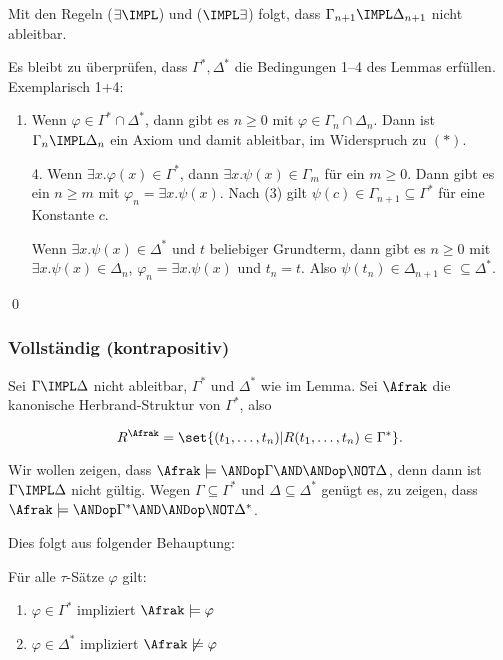 Mit den Regeln ($\exists\IMPL$) und ($\IMPL\exists$) folgt, dass
$\Gamma_{n+1}\IMPL\Delta_{n+1}$ nicht ableitbar.

Es bleibt zu überprüfen, dass $\Gamma^*,\Delta^*$ die Bedingungen 1--4
des Lemmas erfüllen. Exemplarisch 1+4:

\begin{enumerate}
  \item Wenn $\varphi\in\Gamma^*\cap\Delta^*$, dann gibt es $n\geq 0$ mit
  $\varphi\in\Gamma_n\cap\Delta_n$. Dann ist $\Gamma_n\IMPL\Delta_n$ ein
  Axiom und damit ableitbar, im Widerspruch zu $(*)$.
  
  \item[4.] Wenn $\exists x.\varphi(x)\in\Gamma^*$, dann
  $\exists x.\psi(x)\in\Gamma_m$ für ein $m\geq 0$. Dann gibt es ein
  $n\geq m$ mit $\varphi_n=\exists x.\psi(x)$. Nach (3) gilt
  $\psi(c)\in\Gamma_{n+1}\subseteq\Gamma^*$ für eine Konstante $c$.
  
  Wenn $\exists x.\psi(x)\in\Delta^*$ und $t$ beliebiger Grundterm, dann
  gibt es $n\geq 0$ mit $\exists x.\psi(x)\in\Delta_n$,
  $\varphi_n=\exists x.\psi(x)$ und $t_n=t$. Also
  $\psi(t_n)\in\Delta_{n+1}\in\subseteq\Delta^*$.
\end{enumerate}
\qed

\subsubsection{Vollständig (kontrapositiv)}

Sei $\Gamma\IMPL\Delta$ nicht ableitbar, $\Gamma^*$ und $\Delta^*$ wie
im Lemma. Sei $\Afrak$ die kanonische Herbrand-Struktur von $\Gamma^*$,
also

\[
  R^\Afrak = \set{(t_1,\dots,t_n) | R(t_1,\dots,t_n)\in\Gamma^*}.
\]

Wir wollen zeigen, dass $\Afrak\models\ANDop\Gamma \AND \ANDop\NOT\Delta$,
denn dann ist $\Gamma\IMPL\Delta$ nicht gültig. Wegen $\Gamma\subseteq\Gamma^*$
und $\Delta\subseteq\Delta^*$ genügt es, zu zeigen, dass
$\Afrak\models\ANDop\Gamma^* \AND \ANDop \NOT\Delta^*$.

Dies folgt aus folgender Behauptung:

Für alle $\tau$-Sätze $\varphi$ gilt:

\begin{enumerate}
  \item $\varphi\in\Gamma^*$ impliziert $\Afrak\models\varphi$
  \item $\varphi\in\Delta^*$ impliziert $\Afrak\not\models\varphi$
\end{enumerate}
  
